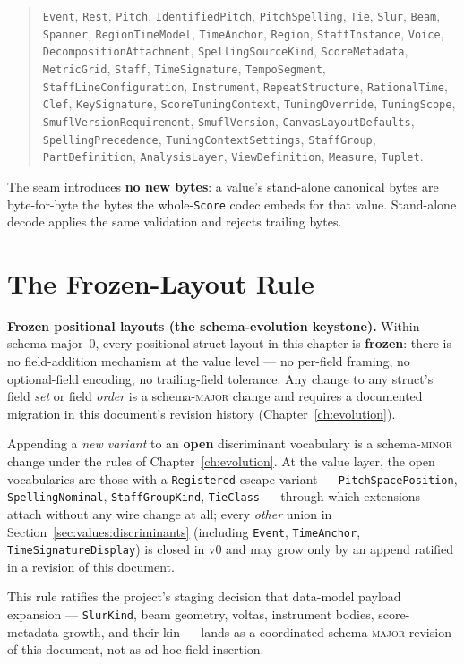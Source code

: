 \documentclass[11pt,letterpaper]{report}
\newcounter{requirement}[chapter]
\begin{document}
\begin{quote}
\texttt{Event}, \texttt{Rest}, \texttt{Pitch},
\texttt{IdentifiedPitch}, \texttt{PitchSpelling}, \texttt{Tie},
\texttt{Slur}, \texttt{Beam}, \texttt{Spanner},
\texttt{RegionTimeModel}, \texttt{TimeAnchor}, \texttt{Region},
\texttt{StaffInstance}, \texttt{Voice},
\texttt{DecompositionAttachment}, \texttt{SpellingSourceKind},
\texttt{ScoreMetadata}, \texttt{MetricGrid}, \texttt{Staff},
\texttt{TimeSignature}, \texttt{TempoSegment},
\texttt{StaffLineConfiguration}, \texttt{Instrument},
\texttt{RepeatStructure}, \texttt{RationalTime}, \texttt{Clef},
\texttt{KeySignature}, \texttt{ScoreTuningContext}, \texttt{TuningOverride},
\texttt{TuningScope}, \texttt{SmuflVersionRequirement},
\texttt{SmuflVersion}, \texttt{CanvasLayoutDefaults},
\texttt{SpellingPrecedence}, \texttt{TuningContextSettings},
\texttt{StaffGroup}, \texttt{PartDefinition}, \texttt{AnalysisLayer},
\texttt{ViewDefinition}, \texttt{Measure}, \texttt{Tuplet}.
\end{quote}

The seam introduces \textbf{no new bytes}: a value's stand-alone canonical
bytes are byte-for-byte the bytes the whole-\texttt{Score} codec embeds for
that value. Stand-alone decode applies the same validation and rejects
trailing bytes.

\section{The Frozen-Layout Rule}
\label{sec:values:frozen}

\begin{requirement}
\label{req:binfmt:frozen-layout}
\textbf{Frozen positional layouts (the schema-evolution keystone).} Within
schema major~0, every positional struct layout in this chapter is
\textbf{frozen}: there is no field-addition mechanism at the value level ---
no per-field framing, no optional-field encoding, no trailing-field
tolerance. Any change to any struct's field \emph{set} or field \emph{order}
is a schema-\textsc{major} change and requires a documented migration in this
document's revision history (Chapter~\ref{ch:evolution}).

Appending a \emph{new variant} to an \textbf{open} discriminant vocabulary is
a schema-\textsc{minor} change under the rules of
Chapter~\ref{ch:evolution}. At the value layer, the open vocabularies are
those with a \texttt{Registered} escape variant ---
\texttt{PitchSpacePosition}, \texttt{SpellingNominal},
\texttt{StaffGroupKind}, \texttt{TieClass} --- through which extensions
attach without any wire change at all; every \emph{other} union in
Section~\ref{sec:values:discriminants} (including \texttt{Event},
\texttt{TimeAnchor}, \texttt{TimeSignatureDisplay}) is closed in v0 and may
grow only by an append ratified in a revision of this document.

This rule ratifies the project's staging decision that data-model payload
expansion --- \texttt{SlurKind}, beam geometry, voltas, instrument bodies,
score-metadata growth, and their kin --- lands as a coordinated
schema-\textsc{major} revision of this document, not as ad-hoc field
insertion.
\end{requirement}
\end{document}
